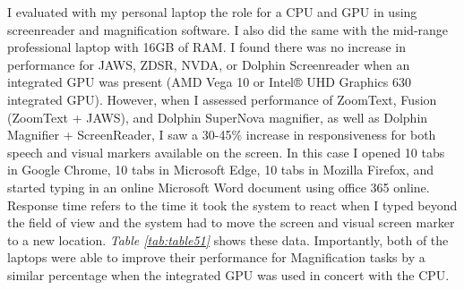 I evaluated with my personal laptop the role for a CPU and GPU in using screenreader and magnification software. I also did the same with the mid-range professional laptop with 16GB of RAM. I found there was no increase in performance for JAWS, ZDSR, NVDA, or Dolphin Screenreader when an integrated GPU was present (AMD Vega 10 or Intel® UHD Graphics 630 integrated GPU). However, when I assessed performance of ZoomText, Fusion (ZoomText + JAWS), and Dolphin SuperNova magnifier, as well as Dolphin Magnifier + ScreenReader, I saw a 30-45\% increase in responsiveness for both speech and visual markers available on the screen. In this case I opened 10 tabs in Google Chrome, 10 tabs in Microsoft Edge, 10 tabs in Mozilla Firefox, and started typing in an online Microsoft Word document using office 365 online. Response time refers to the time it took the system to react when I typed beyond the field of view and the system had to move the screen and visual screen marker to a new location. \textit{Table \ref{tab:table51}} shows these data. Importantly, both of the laptops were able to improve their performance for Magnification tasks by a similar percentage when the integrated GPU was used in concert with the CPU.
 
